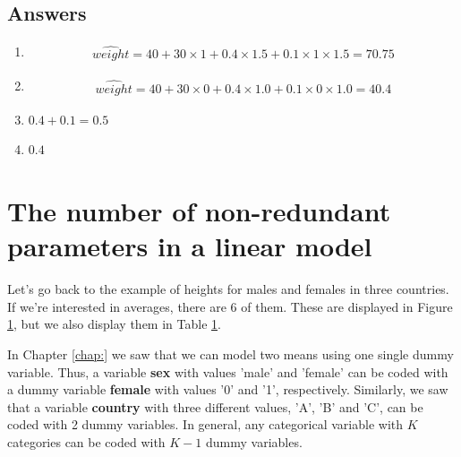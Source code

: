 \documentclass[]{book}\usepackage[]{graphicx}\usepackage[]{color}
\begin{document}
\subsection{Answers}

\begin{enumerate}

\item 
\begin{eqnarray}
\widehat{weight}= 40 + 30 \times 1 + 0.4\times 1.5 + 0.1 \times 1\times 1.5 =70.75 \nonumber
\end{eqnarray}

\item
\begin{eqnarray}
\widehat{weight}= 40 + 30 \times 0 + 0.4\times 1.0 + 0.1 \times 0\times 1.0 =40.4\nonumber
\end{eqnarray}


\item{$0.4 + 0.1 = 0.5$}

\item{$0.4$}


\end{enumerate}

\section{The number of non-redundant parameters in a linear model}

Let's go back to the example of heights for males and females in three countries. If we're interested in averages, there are 6 of them. These are displayed in Figure \ref{}, but we also display them in Table \ref{}.

In Chapter \ref{chap:} we saw that we can model two means using one single dummy variable. Thus, a variable \textbf{sex} with values 'male' and 'female' can be coded with a dummy variable \textbf{female} with values '0' and '1', respectively. Similarly, we saw that a variable \textbf{country} with three different values, 'A', 'B' and 'C', can be coded with 2 dummy variables. In general, any categorical variable with $K$ categories can be coded with $K-1$ dummy variables.

% 
\end{document}

